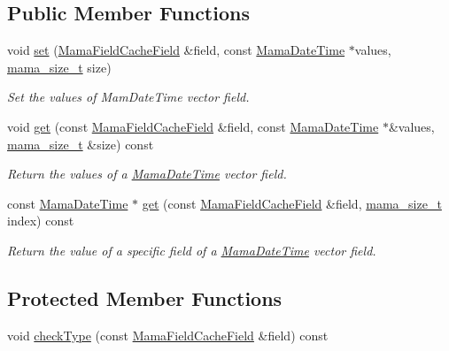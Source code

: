 \subsection*{Public Member Functions}
\begin{DoxyCompactItemize}
\item 
void \hyperlink{classWombat_1_1MamaFieldCacheFieldDateTimeVector_a9b6abc070e46a310e9c31800037d7209}{set} (\hyperlink{classWombat_1_1MamaFieldCacheField}{MamaFieldCacheField} \&field, const \hyperlink{classWombat_1_1MamaDateTime}{MamaDateTime} $\ast$values, \hyperlink{classmama__size__t}{mama\_\-size\_\-t} size)
\begin{DoxyCompactList}\small\item\em Set the values of MamDateTime vector field. \item\end{DoxyCompactList}\item 
void \hyperlink{classWombat_1_1MamaFieldCacheFieldDateTimeVector_a92246a2afd91bb502c46b714e771a431}{get} (const \hyperlink{classWombat_1_1MamaFieldCacheField}{MamaFieldCacheField} \&field, const \hyperlink{classWombat_1_1MamaDateTime}{MamaDateTime} $\ast$\&values, \hyperlink{classmama__size__t}{mama\_\-size\_\-t} \&size) const 
\begin{DoxyCompactList}\small\item\em Return the values of a \hyperlink{classWombat_1_1MamaDateTime}{MamaDateTime} vector field. \item\end{DoxyCompactList}\item 
const \hyperlink{classWombat_1_1MamaDateTime}{MamaDateTime} $\ast$ \hyperlink{classWombat_1_1MamaFieldCacheFieldDateTimeVector_aa76d3e79b75038d208d33d9d17519f8c}{get} (const \hyperlink{classWombat_1_1MamaFieldCacheField}{MamaFieldCacheField} \&field, \hyperlink{classmama__size__t}{mama\_\-size\_\-t} index) const 
\begin{DoxyCompactList}\small\item\em Return the value of a specific field of a \hyperlink{classWombat_1_1MamaDateTime}{MamaDateTime} vector field. \item\end{DoxyCompactList}\end{DoxyCompactItemize}
\subsection*{Protected Member Functions}
\begin{DoxyCompactItemize}
\item 
void \hyperlink{classWombat_1_1MamaFieldCacheFieldDateTimeVector_a3032d98deb67dbb3a1bb8c4599ee48b5}{checkType} (const \hyperlink{classWombat_1_1MamaFieldCacheField}{MamaFieldCacheField} \&field) const 
\end{DoxyCompactItemize}


